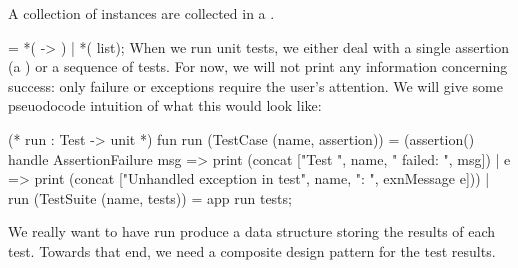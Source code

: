A collection of {\Tt{}\nwendquote} instances are collected in a {\Tt{}\nwendquote}.

\nwenddocs{}\endmoddef\nwstartdeflinemarkup{}\nwenddeflinemarkup
{}  =   *( -> )
              |   *( list);
\eatline
{}\nwendcode{}\nwdocspar
When we run unit tests, we either deal with a single assertion (a
{\Tt{}\nwendquote}) or a sequence of tests. For now, we will not print
any information concerning success: only failure or exceptions require
the user's attention. We will give some pseuodocode intuition of what
this would look like:

\begin{sml}
(* run : Test -> unit *)
fun run (TestCase (name, assertion))
    = (assertion()
       handle AssertionFailure msg => print (concat ["Test ",
                                                     name,
                                                     " failed: ",
                                                     msg])
            | e => print (concat ["Unhandled exception in test",
                                  name,
                                  ": ",
                                  exnMessage e]))
  | run (TestSuite (name, tests)) = app run tests;
\end{sml}

We really want to have {\Tt{}run\nwendquote} produce a data structure storing the
results of each test. Towards that end, we need a composite design
pattern for the test results.

